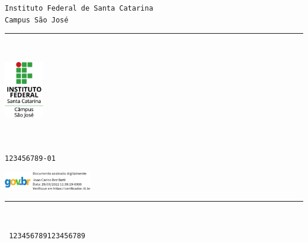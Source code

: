 \documentclass[11pt,a4paper]{memoir}
\begin{document}
    \begin{Spacing}{0.75}%
    \noindent
    \texttt{\fontsize{4mm}{5mm}\selectfont Instituto Federal de Santa Catarina}\\
    \texttt{\fontsize{3mm}{4mm}\selectfont Campus São José}\\ 
    \rule{74mm}{.3mm}\\
    \begin{minipage}[t]{33mm}
        \vspace{-2mm}%
        \hspace*{0mm}\includegraphics[height=25mm]{logo-ifsc-saojose.png}
    \end{minipage}
    \hspace{1mm}
    \begin{minipage}[t]{42mm}
        \vspace{-4mm}%
        \begin{flushleft}
        {\scriptsize
            \begin{Spacing}{1}%
            \vspace{1mm}
            \hspace{-17mm}\texttt{\fontsize{2.6mm}{2mm}}\\
            \hspace{-17mm}\texttt{\fontsize{2.6mm}{2mm}}\\
            \hspace{-17mm}\texttt{\fontsize{2.6mm}{2mm}123456789-01}
            \end{Spacing}
        }
    \begin{minipage}[t]{33mm}
        \vspace{0mm}%
        \hspace*{-2mm} \includegraphics[height=8mm]{assinatura.png}
    \end{minipage}
        \end{flushleft}
    \end{minipage}
    \vspace{-0.5mm}
    \rule{74mm}{0.3mm}\\
    \end{Spacing}
    \vspace{-5mm} \hspace{40mm} \texttt{\fontsize{2mm}{3mm} 123456789123456789}
\end{document}
